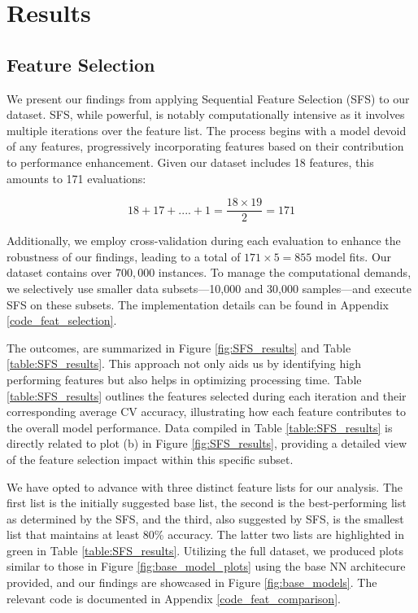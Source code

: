 \documentclass[]{article}
\begin{document}
\clearpage
\section{Results}


\subsection{Feature Selection}


We present our findings from applying Sequential Feature Selection (SFS) to our dataset. SFS, while powerful, is notably computationally intensive as it involves multiple iterations over the feature list. The process begins with a model devoid of any features, progressively incorporating features based on their contribution to performance enhancement. Given our dataset includes 18 features, this amounts to 171 evaluations:

$$18 + 17 + ....  + 1 = \frac{18 \times 19}{2} = 171 $$

Additionally, we employ cross-validation during each evaluation to enhance the robustness of our findings, leading to a total of 
$171 \times 5 =855$ model fits. Our dataset contains over $700,000$ instances. To manage the computational demands, we selectively use smaller data subsets—10,000 and 30,000 samples—and execute SFS on these subsets. The implementation details can be found in Appendix \ref{code_feat_selection}. 

The outcomes, are summarized in Figure \ref{fig:SFS_results} and Table \ref{table:SFS_results}. This approach not only aids us by identifying high performing features but also helps in optimizing processing time.  Table \ref{table:SFS_results} outlines the features selected during each iteration and their corresponding average CV accuracy, illustrating how each feature contributes to the overall model performance. Data compiled in Table \ref{table:SFS_results} is directly related to plot (b) in Figure \ref{fig:SFS_results}, providing a detailed view of the feature selection impact within this specific subset.

We have opted to advance with three distinct feature lists for our analysis. The first list is the initially suggested base list, the second is the best-performing list as determined by the SFS, and the third, also suggested by SFS, is the smallest list that maintains at least 80\% accuracy. The latter two lists are highlighted in green in Table \ref{table:SFS_results}. Utilizing the full dataset, we produced plots similar to those in Figure \ref{fig:base_model_plots} using the base NN architecure provided, and our findings are showcased in Figure \ref{fig:base_models}. The relevant code is documented in Appendix \ref{code_feat_comparison}.
\end{document}
